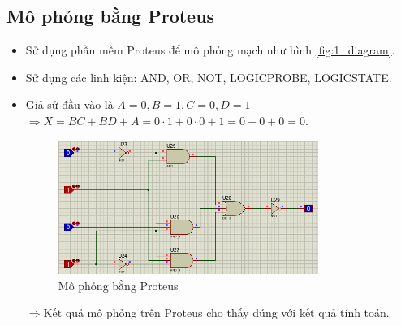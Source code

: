     \subsection{Mô phỏng bằng Proteus}
        \begin{itemize}
            \item Sử dụng phần mềm Proteus để mô phỏng mạch như hình \ref{fig:1_diagram}.
            \item Sử dụng các linh kiện: AND, OR, NOT, LOGICPROBE, LOGICSTATE.
            \item Giả sử đầu vào là $A = 0, B = 1, C = 0, D = 1 $ \\[0.2cm]
             $\Rightarrow X = \bar{B}\bar{C} + \bar{B}\bar{D} + A = 0 \cdot 1 + 0 \cdot 0 + 1 = 0 + 0 + 0 = 0$.\\
             \begin{figure}[H]
                \centering
                \includegraphics[width=0.8\textwidth]{pictures/1_result.png}
                \caption{Mô phỏng bằng Proteus}
            \end{figure}
            $\Rightarrow$\hspace*{0.6cm}Kết quả mô phỏng trên Proteus cho thấy đúng với kết quả tính toán.
        \end{itemize}
    
        